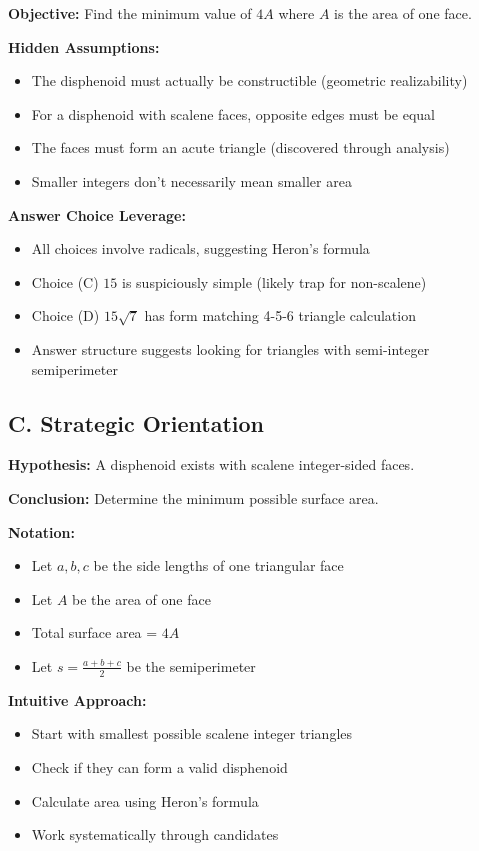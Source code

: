 \documentclass[12pt]{article}
\begin{document}
\begin{problemconfigbox}
\textbf{Objective:} Find the minimum value of $4A$ where $A$ is the area of one face.

\textbf{Hidden Assumptions:}
\begin{itemize}
    \item The disphenoid must actually be constructible (geometric realizability)
    \item For a disphenoid with scalene faces, opposite edges must be equal
    \item The faces must form an acute triangle (discovered through analysis)
    \item Smaller integers don't necessarily mean smaller area
\end{itemize}

\textbf{Answer Choice Leverage:}
\begin{itemize}
    \item All choices involve radicals, suggesting Heron's formula
    \item Choice (C) $15$ is suspiciously simple (likely trap for non-scalene)
    \item Choice (D) $15\sqrt{7}$ has form matching 4-5-6 triangle calculation
    \item Answer structure suggests looking for triangles with semi-integer semiperimeter
\end{itemize}

\subsection*{C. Strategic Orientation}

\textbf{Hypothesis:} A disphenoid exists with scalene integer-sided faces.

\textbf{Conclusion:} Determine the minimum possible surface area.

\textbf{Notation:}
\begin{itemize}
    \item Let $a, b, c$ be the side lengths of one triangular face
    \item Let $A$ be the area of one face
    \item Total surface area = $4A$
    \item Let $s = \frac{a+b+c}{2}$ be the semiperimeter
\end{itemize}

\textbf{Intuitive Approach:} 
\begin{itemize}
    \item Start with smallest possible scalene integer triangles
    \item Check if they can form a valid disphenoid
    \item Calculate area using Heron's formula
    \item Work systematically through candidates
\end{itemize}


\end{problemconfigbox}
\end{document}
